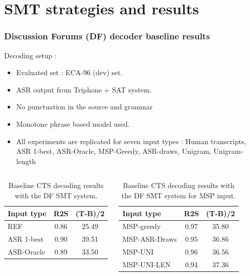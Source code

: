 \documentclass{beamer}
\begin{document}
\section{SMT strategies and results} %

\begin{frame}
\frametitle{Discussion Forums (DF) decoder baseline results}
Decoding setup :
\begin{itemize} 
\item Evaluated set :  ECA-96 (dev) set.
\item ASR output from Triphone + SAT system.
\item No punctuation in the source and grammar
\item Monotone phrase based model used.
\item All experiments are replicated for seven input types : Human transcripts, ASR 1-best, ASR-Oracle, MSP-{Greedy, ASR-draws, Unigram, Unigram-length}
\end{itemize}

\begin{columns}[c] %

\small{
\begin{table}
\begin{center}
\begin{tabular}{|| l || c | c ||}
  \hline 
  \textbf{Input type} & \textbf{R2S} & \textbf{(T-B)/2}\\ \hline
  REF & 0.86 & 25.49\\
  \hline
  ASR 1-best & 0.90 & 39.51\\
  \hline
  ASR-Oracle & 0.89 & 33.50\\
  \hline
\end{tabular}
\caption{Baseline CTS decoding results with the DF SMT system.}
\end{center}
\end{table}
}

\small{
\begin{table}
\begin{center}
\begin{tabular}{|| l || c | c ||}
  \hline 
  \textbf{Input type} & \textbf{R2S} & \textbf{(T-B)/2}\\ \hline
  MSP-greedy & 0.97 & 35.80\\
  \hline
  MSP-ASR-Draws & 0.95 & 36.86\\
  \hline
  MSP-UNI & 0.96 & 36.56\\
  \hline
  MSP-UNI-LEN & 0.94 & 37.36\\
  \hline
\end{tabular}
\caption{Baseline CTS decoding results with the DF SMT system for MSP input.}
\end{center}
\end{table}
}

\end{columns}
\end{frame}
\end{document}
